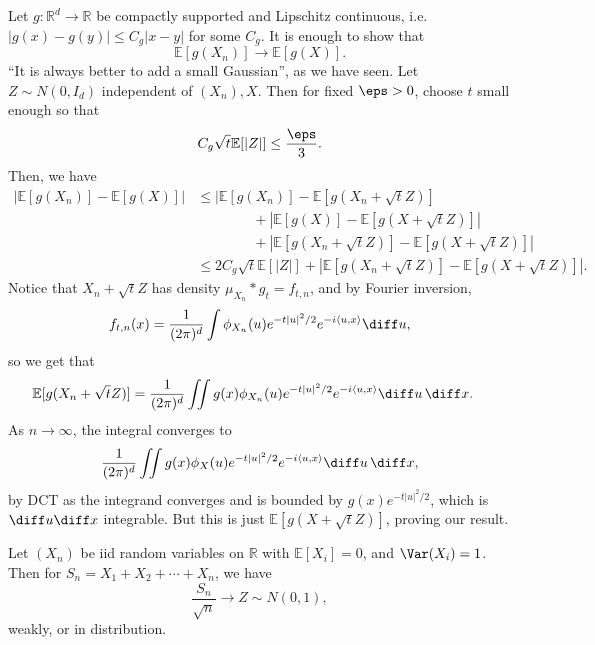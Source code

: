\documentclass[12pt]{article}
\begin{document}

\begin{proofbox}
	Let $g : \mathbb{R}^d \to \mathbb{R}$ be compactly supported and Lipschitz continuous, i.e. $|g(x) - g(y)| \leq C_g |x - y|$ for some $C_g$. It is enough to show that
	\[
	\mathbb{E}[g(X_n)] \to \mathbb{E}[g(X)].
	\]
	``It is always better to add a small Gaussian'', as we have seen. Let $Z \sim N(0, I_d)$ independent of $(X_n), X$. Then for fixed $\eps > 0$, choose $t$ small enough so that
	\[
	C_g \sqrt t \mathbb{E}[|Z|] \leq \frac{\eps}{3}.
	\]
	Then, we have
	\begin{align*}
		|\mathbb{E}[g(X_n)] - \mathbb{E}[g(X)]| &\leq |\mathbb{E}[g(X_n)] - \mathbb{E}[g(X_n + \sqrt t Z)] \\
							& \qquad \qquad + |\mathbb{E}[g(X)] - \mathbb{E}[g(X + \sqrt t Z)]| \\
							& \qquad \qquad + |\mathbb{E}[g(X_n + \sqrt t Z)] - \mathbb{E}[g(X + \sqrt t Z)]| \\
							&\leq 2 C_g \sqrt t \mathbb{E}[|Z|] + |\mathbb{E}[g(X_n + \sqrt t Z)] - \mathbb{E}[g(X + \sqrt t Z)]|.
	\end{align*}
	Notice that $X_n + \sqrt t Z$ has density $\mu_{X_n} \ast g_t = f_{t, n}$, and by Fourier inversion,
	\[
	f_{t, n}(x) = \frac{1}{(2 \pi)^d} \int \phi_{X_n}(u) e^{-t|u|^2/2} e^{-i \langle u, x\rangle} \diff u,
	\]
	so we get that
	\begin{align*}
		\mathbb{E}[g(X_n + \sqrt t Z)] &= \frac{1}{(2 \pi)^d} \iint g(x) \phi_{X_n}(u) e^{-t|u|^2/2} e^{-i \langle u, x\rangle} \diff u \, \diff x.
	\end{align*}
	As $n \to \infty$, the integral converges to
	\[
	\frac{1}{(2 \pi)^d} \iint g(x) \phi_{X}(u) e^{-t|u|^2/2} e^{-i\langle u, x\rangle} \diff u \, \diff x,
	\]
	by DCT as the integrand converges and is bounded by $g(x) e^{-t|u|^2/2}$, which is $\diff u \diff x$ integrable. But this is just $\mathbb{E}[g(X + \sqrt t Z)]$, proving our result.
\end{proofbox}

\begin{theorem}
	Let $(X_n)$ be iid random variables on $\mathbb{R}$ with $\mathbb{E}[X_i] = 0$, and $\Var(X_i) = 1$. Then for $S_n = X_1 + X_2 + \cdots + X_n$, we have
	\[
	\frac{S_n}{\sqrt n} \to Z \sim N(0, 1),
	\]
	weakly, or in distribution.
\end{theorem}
\end{document}
